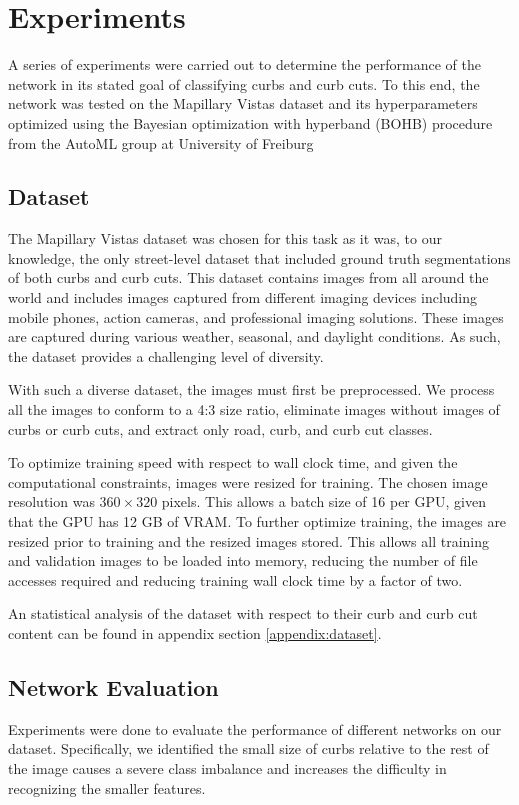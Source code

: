 \chapter{Experiments}\label{chap:experiments}
A series of experiments were carried out to determine the performance of the network in its stated goal of classifying curbs and curb cuts. To this end, the network was tested on the Mapillary Vistas dataset \cite{mapillary} and its hyperparameters optimized using the Bayesian optimization with hyperband (BOHB) procedure from the AutoML group at University of Freiburg \cite{bohb}

\section{Dataset} \label{section:experiments-dataset}
The Mapillary Vistas dataset was chosen for this task as it was, to our knowledge, the only street-level dataset that included ground truth segmentations of both curbs and curb cuts.
This dataset contains images from all around the world and includes images captured from different imaging devices including mobile phones, action cameras, and professional imaging solutions.
These images are captured during various weather, seasonal, and daylight conditions.
As such, the dataset provides a challenging level of diversity.

With such a diverse dataset, the images must first be preprocessed.
We process all the images to conform to a 4:3 size ratio, eliminate images without images of curbs or curb cuts, and extract only road, curb, and curb cut classes.

To optimize training speed with respect to wall clock time, and given the computational constraints, images were resized for training.
The chosen image resolution was $360 \times 320$ pixels. 
This allows a batch size of 16 per GPU, given that the GPU has 12 GB of VRAM.
To further optimize training, the images are resized prior to training and the resized images stored.
This allows all training and validation images to be loaded into memory, reducing the number of file accesses required and reducing training wall clock time by a factor of two.

An statistical analysis of the dataset with respect to their curb and curb cut content can be found in appendix section \ref{appendix:dataset}.

\section{Network Evaluation}\label{section:experiments-networkevaluation}
Experiments were done to evaluate the performance of different networks on our dataset.
Specifically, we identified the small size of curbs relative to the rest of the image causes a severe class imbalance and increases the difficulty in recognizing the smaller features.

